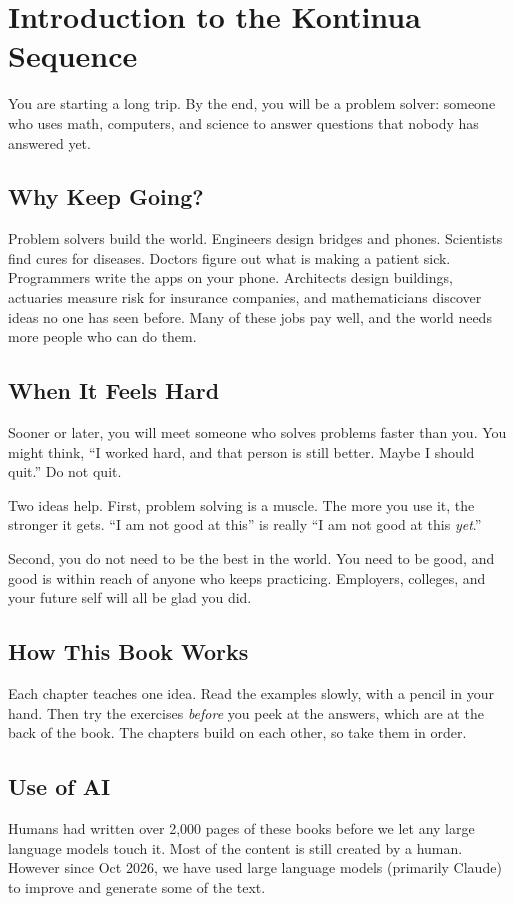 \chapter{Introduction to the Kontinua Sequence}

You are starting a long trip. By the end, you will be a problem solver:
someone who uses math, computers, and science to answer questions that
nobody has answered yet.

\section{Why Keep Going?}
Problem solvers build the world. Engineers design bridges and phones.
Scientists find cures for diseases. Doctors figure out what is making a
patient sick. Programmers write the apps on your phone. Architects design
buildings, actuaries measure risk for insurance companies, and
mathematicians discover ideas no one has seen before.
Many of these jobs pay well, and the world needs more people who can do
them.

\section{When It Feels Hard}
Sooner or later, you will meet someone who solves problems faster than
you. You might think, ``I worked hard, and that person is still better.
Maybe I should quit.'' Do not quit.

Two ideas help. First, problem solving is a muscle. The more you use it,
the stronger it gets. ``I am not good at this'' is really ``I am not good
at this \emph{yet}.''

Second, you do not need to be the best in the world. You need to be
good, and good is within reach of anyone who keeps practicing. Employers,
colleges, and your future self will all be glad you did.

\section{How This Book Works}
Each chapter teaches one idea. Read the examples slowly, with a pencil in
your hand. Then try the exercises \emph{before} you peek at the answers,
which are at the back of the book. The chapters build on each other, so
take them in order.

\section{Use of AI}
Humans had written over 2,000 pages of these books before we let any large
language models touch it. Most of the content is still created by a human.
However since Oct 2026, we have used large language models (primarily Claude) to
improve and generate some of the text.

